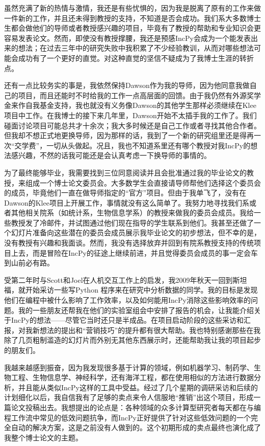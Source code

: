 \documentclass[letter,12pt]{book}
\begin{document}
\begin{CJK}{UTF8}{gbsn}
虽然充满了新的热情与激情，我还是有些忧惧的，因为我是脱离了原有的工作来做一件新的工作，并且还未得到教授的支持，不知道是否会成功。我们系大多数博士生都会做他们的导师或者教授感兴趣的项目，毕竟有了教授的帮助和专业知识会更容易发表论文。然而，即使没有教授撑腰，我还是预感IncPy会成为一个能发表出来的想法；在过去三年中的研究失败中我积累了不少经验教训，从而对哪些想法可能会成功有了一个更好的直觉。对这种直觉的坚信不疑成为了我博士生涯的转折点。

还有一点比较务实的事是，我依然保持Dawson作为我的导师，因为他同意我做自己的项目，而且还能时不时给我的工作一点高层面的回馈。由于我仍然有外源奖学金来作自我基金支持，我也就没有义务像Dawson的其他学生那样必须继续在Klee项目中工作。在我博士的接下来几年里，Dawson开始不太插手我的工作了。我们碰面讨论项目可能总共才十余次；我大多时候还是自己工作或者寻找其他合作者。但我却不想正式地更换导师，因为那样的话，我到了一个新的研究组里还是得再一次“交学费”，一切从头做起。况且，我也不知道系里还有哪个教授对我IncPy的想法感兴趣，不然的话我可能还是会认真考虑一下换导师的事情的。

为了最终能够毕业，我需要找到三位同意阅读并且会批准通过我的毕业论文的教授，来组成一个博士论文委员会。大多数学生会直接请导师帮他们选择这个委员会的成员，毕竟他们一直在做导师指定的“官方”项目。但由于我单飞了，没有在Dawson的Klee项目上开展工作，事情就没有这么简单了。我努力地寻找我们系或者其他相关院系（如统计系，生物信息学系）的教授来做我的委员会成员。我给一些教授发了冷邮件，并试图通过他们现在指导的学生联系到他们。我甚至还做了一个幻灯片准备向这些潜在的委员会成员展示我毕业论文的初步想法，但不幸的是，没有教授有兴趣和我面谈。然而，我没有选择放弃并回到有院系教授支持的传统项目上去，而是冒险在IncPy的征途上继续前进，并且觉得委员会成员的事一定会车到山前必有路。

\breakline

受第二年时与Scott和Joel在人机交互工作上的启发，我2009年秋天一回到斯坦福，就开始采访一些写Python 程序来在研究中分析数据的同学。我的目标是发现他们在编程中被什么影响了工作效率，以及如何能用IncPy消除这些影响效率的问题。我的一些朋友还帮我在他们的实验室组会中安排了报告的机会，让我能介绍关于IncPy的想法——尽管它当时还只是半成品。在项目启动阶段的这些采访和汇报，对我新想法的提出和“营销技巧”的提升都有很大帮助。我也特别感谢那些在我除了几页粗制滥造的幻灯片而外别无其他东西展示时，还能帮助我让我的项目起步的朋友们。

我越来越感到振奋，因为我发现很多基于计算的领域，例如机器学习、制药学、生物工程、生物信息学、神经科学，还有海洋工程，都在使用相似的方法进行数据分析，并且能从类似IncPy这样的工具中受益。经过了几个星期的调研采访和后续的计划细化以后，我自信我有了足够的卖点来令人信服地“推销”出这个项目，形成一篇论文投稿出去。我想提出的论点是：各种领域的众多计算型研究者每天都在与编程工作流中常见的低效问题抗争，而IncPy正好提供了针对这些低效问题的一个完全自动的解决方案，这是之前没有人做到的。这个初期形成的卖点最终也演化成了我整个博士论文的主题。


\end{CJK}
\end{document}
